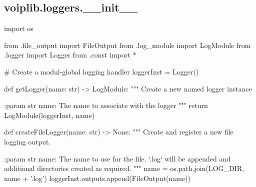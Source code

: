 \subsection{voiplib.loggers.\_\_init\_\_}
\begin{pythoncode}
import os

from .file_output import FileOutput
from .log_module import LogModule
from .logger import Logger
from .const import *


# Create a modul-global logging handler
loggerInst = Logger()


def getLogger(name: str) -> LogModule:
    """
    Create a new named logger instance

    :param str name: The name to associate with the logger
    """
    return LogModule(loggerInst, name)


def createFileLogger(name: str) -> None:
    """
    Create and register a new file logging output.

    :param str name: The name to use for the file. `.log` will be appended
        and additional directories created as required.
    """
    name = os.path.join(LOG_DIR, name + '.log')
    loggerInst.outputs.append(FileOutput(name))
\end{pythoncode}
